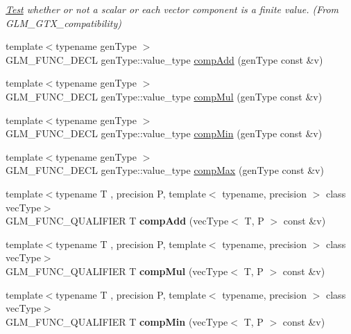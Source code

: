 \begin{DoxyCompactItemize}
\begin{DoxyCompactList}\small\item\em \hyperlink{class_test}{Test} whether or not a scalar or each vector component is a finite value. (From G\-L\-M\-\_\-\-G\-T\-X\-\_\-compatibility) \end{DoxyCompactList}\item 
{\footnotesize template$<$typename gen\-Type $>$ }\\G\-L\-M\-\_\-\-F\-U\-N\-C\-\_\-\-D\-E\-C\-L gen\-Type\-::value\-\_\-type \hyperlink{group__gtx__component__wise_gaf71833350e15e74d31cbf8a3e7f27051}{comp\-Add} (gen\-Type const \&v)
\item 
{\footnotesize template$<$typename gen\-Type $>$ }\\G\-L\-M\-\_\-\-F\-U\-N\-C\-\_\-\-D\-E\-C\-L gen\-Type\-::value\-\_\-type \hyperlink{group__gtx__component__wise_gae8ab88024197202c9479d33bdc5a8a5d}{comp\-Mul} (gen\-Type const \&v)
\item 
{\footnotesize template$<$typename gen\-Type $>$ }\\G\-L\-M\-\_\-\-F\-U\-N\-C\-\_\-\-D\-E\-C\-L gen\-Type\-::value\-\_\-type \hyperlink{group__gtx__component__wise_gab5d0832b5c7bb01b8d7395973bfb1425}{comp\-Min} (gen\-Type const \&v)
\item 
{\footnotesize template$<$typename gen\-Type $>$ }\\G\-L\-M\-\_\-\-F\-U\-N\-C\-\_\-\-D\-E\-C\-L gen\-Type\-::value\-\_\-type \hyperlink{group__gtx__component__wise_gabfa4bb19298c8c73d4217ba759c496b6}{comp\-Max} (gen\-Type const \&v)
\item 
\hypertarget{namespaceglm_a766b58e13ddfe3140ce22939887aa954}{{\footnotesize template$<$typename T , precision P, template$<$ typename, precision $>$ class vec\-Type$>$ }\\G\-L\-M\-\_\-\-F\-U\-N\-C\-\_\-\-Q\-U\-A\-L\-I\-F\-I\-E\-R T {\bfseries comp\-Add} (vec\-Type$<$ T, P $>$ const \&v)}\label{namespaceglm_a766b58e13ddfe3140ce22939887aa954}

\item 
\hypertarget{namespaceglm_a2b7811672b3a9afce8913dae19548b30}{{\footnotesize template$<$typename T , precision P, template$<$ typename, precision $>$ class vec\-Type$>$ }\\G\-L\-M\-\_\-\-F\-U\-N\-C\-\_\-\-Q\-U\-A\-L\-I\-F\-I\-E\-R T {\bfseries comp\-Mul} (vec\-Type$<$ T, P $>$ const \&v)}\label{namespaceglm_a2b7811672b3a9afce8913dae19548b30}

\item 
\hypertarget{namespaceglm_a1577bdcf5f8b76fb66296ac53fe77fa8}{{\footnotesize template$<$typename T , precision P, template$<$ typename, precision $>$ class vec\-Type$>$ }\\G\-L\-M\-\_\-\-F\-U\-N\-C\-\_\-\-Q\-U\-A\-L\-I\-F\-I\-E\-R T {\bfseries comp\-Min} (vec\-Type$<$ T, P $>$ const \&v)}\label{namespaceglm_a1577bdcf5f8b76fb66296ac53fe77fa8}


\end{DoxyCompactItemize}
